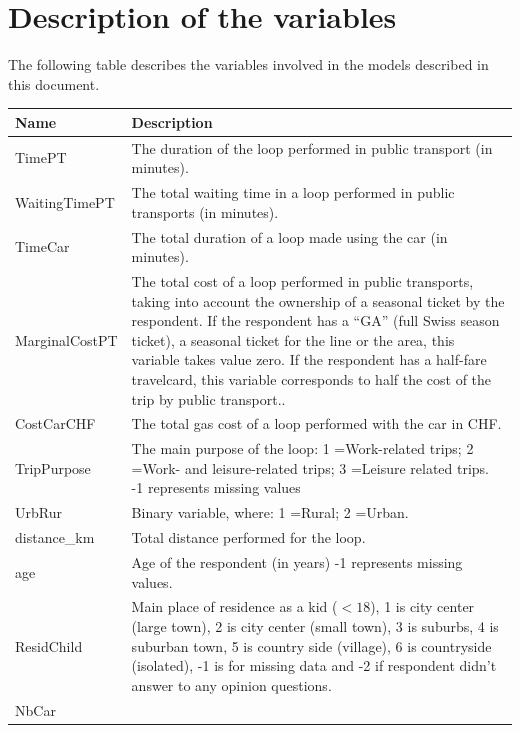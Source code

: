 \documentclass[12pt,a4paper]{article}
\let\OrigUnderscore\_
\def\_{\OrigUnderscore\penalty0\hspace{0pt}}%
\begin{document}
\appendix
\section{Description of the variables}
\label{sec:variables}

The following table describes the variables involved in the models
described in this document.

\begin{longtable}{p{4cm}|p{10.5cm}}
		\hline \textbf{Name} & \textbf{Description}\\
		\hline TimePT & The duration of the loop performed in
                public transport (in minutes).\tabularnewline \hline
                WaitingTimePT & The total waiting time in a loop
                performed in public transports (in
                minutes).\tabularnewline \hline TimeCar & The total
                duration of a loop made using the car (in
                minutes).\tabularnewline \hline MarginalCostPT & The
                total cost of a loop performed in public transports,
                taking into account the ownership of a seasonal ticket
                by the respondent. If the respondent has a ``GA''
                (full Swiss season ticket), a seasonal ticket for the
                line or the area, this variable takes value zero. If
                the respondent has a half-fare travelcard, this
                variable corresponds to half the cost of the trip by
                public transport..\tabularnewline \hline CostCarCHF &
                The total gas cost of a loop performed with the car in
                CHF.\tabularnewline \hline TripPurpose & The main
                purpose of the loop: 1 =Work-related trips; 2 =Work-
                and leisure-related trips; 3 =Leisure related
                trips. -1 represents missing values \tabularnewline
                \hline UrbRur & Binary variable, where: 1 =Rural; 2
                =Urban.\tabularnewline \hline distance\_km & Total
                distance performed for the loop.\tabularnewline \hline
                age & Age of the respondent (in years) -1 represents
                missing values.\tabularnewline \hline ResidChild &
                Main place of residence as a kid ($<18$), 1 is city
                center (large town), 2 is city center (small town), 3
                is suburbs, 4 is suburban town, 5 is country side
                (village), 6 is countryside (isolated), -1 is for
                missing data and -2 if respondent didn't answer to any
                opinion questions. \tabularnewline \hline NbCar &

\end{longtable}
\end{document}
